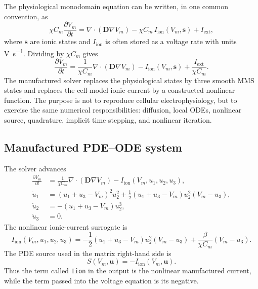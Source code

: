 \documentclass[11pt,a4paper]{article}
\newcommand{\code}[1]{\texttt{\small #1}}
\newcommand{\Vm}{V_m}
\newcommand{\Iion}{I_{\mathrm{ion}}}
\newcommand{\Dten}{\mathbf{D}}
\newcommand{\grad}{\nabla}
\newcommand{\divg}{\nabla\!\cdot}
\begin{document}
The physiological monodomain equation can be written, in one common convention,
as
\begin{equation}
  \chi C_m \frac{\partial \Vm}{\partial t}
  =
  \divg(\Dten \grad \Vm)
  - \chi C_m\,\Iion(\Vm,\mathbf{s})
  + I_{\mathrm{ext}},
  \label{eq:phys-monodomain}
\end{equation}
where $\mathbf{s}$ are ionic states and $\Iion$ is often stored as a voltage
rate with units \si{\volt\per\second}. Dividing by $\chi C_m$ gives
\begin{equation}
  \frac{\partial \Vm}{\partial t}
  =
  \frac{1}{\chi C_m}\divg(\Dten\grad\Vm)
  - \Iion(\Vm,\mathbf{s})
  + \frac{I_{\mathrm{ext}}}{\chi C_m}.
\end{equation}
The manufactured solver replaces the physiological states by three smooth MMS
states and replaces the cell-model ionic current by a constructed nonlinear
function. The purpose is not to reproduce cellular electrophysiology, but to
exercise the same numerical responsibilities: diffusion, local ODEs, nonlinear
source, quadrature, implicit time stepping, and nonlinear iteration.

\subsection{Manufactured PDE--ODE system}

The solver advances
\begin{align}
  \frac{\partial \Vm}{\partial t}
  &=
  \frac{1}{\chi C_m}\divg(\Dten\grad\Vm)
  - \Iion(\Vm,u_1,u_2,u_3),
  \label{eq:mms-pde}\\
  \dot u_1
  &=
  (u_1+u_3-\Vm)^2 u_2^2
  + \frac{1}{2}(u_1+u_3-\Vm)u_2^2(\Vm-u_3),
  \label{eq:mms-u1}\\
  \dot u_2
  &=
  -(u_1+u_3-\Vm)u_2^3,
  \label{eq:mms-u2}\\
  \dot u_3 &= 0.
  \label{eq:mms-u3}
\end{align}
The nonlinear ionic-current surrogate is
\begin{equation}
  \Iion(\Vm,u_1,u_2,u_3)
  =
  -\frac{1}{2}(u_1+u_3-\Vm)u_2^2(\Vm-u_3)
  + \frac{\beta}{\chi C_m}(\Vm-u_3).
  \label{eq:mms-iion}
\end{equation}
The PDE source used in the matrix right-hand side is
\begin{equation}
  S(\Vm,\mathbf{u})=-\Iion(\Vm,\mathbf{u}).
  \label{eq:mms-source}
\end{equation}
Thus the term called \code{Iion} in the output is the nonlinear manufactured
current, while the term passed into the voltage equation is its negative.
\end{document}
